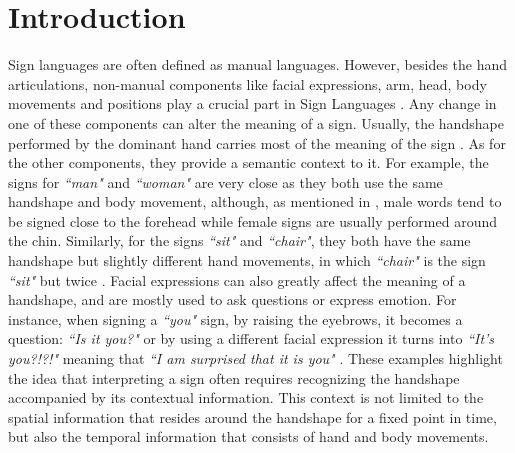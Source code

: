 \documentclass[a4paper,conference]{IEEEtran}
\begin{document}
\section{Introduction}

Sign languages are often defined as manual languages. However, besides the hand articulations, non-manual components like facial expressions, arm, head, body movements and positions play a crucial part in Sign Languages \cite{hand1}. Any change in one of these components can alter the meaning of a sign. Usually, the handshape performed by the dominant hand carries most of the meaning of the sign \cite{hand2}. As for the other components, they provide a semantic context to it. For example, the signs for \textit{``man"} and \textit{``woman"} are very close as they both use the same handshape and body movement, although, as mentioned in \cite{omniglot}, male words tend to be signed close to the forehead while female signs are usually performed around the chin. Similarly, for the signs \textit{``sit"} and \textit{``chair"}, they both have the same handshape but slightly different hand movements, in which \textit{``chair"} is the sign \textit{``sit"} but twice \cite{valli2000linguistics}. Facial expressions can also greatly affect the meaning of a handshape, and are mostly used to ask questions or express emotion. For instance, when signing a \textit{``you"} sign, by raising the eyebrows, it becomes a question: \textit{``Is it you?"} or by using a different facial expression it turns into \textit{``It's you?!?!"} meaning that \textit{``I am surprised that it is you"} \cite{lifeprint}. These examples highlight the idea that interpreting a sign often requires recognizing the handshape accompanied by its contextual information. This context is not limited to the spatial information that resides around the handshape for a fixed point in time, but also the temporal information that consists of hand and body movements. 
\end{document}
